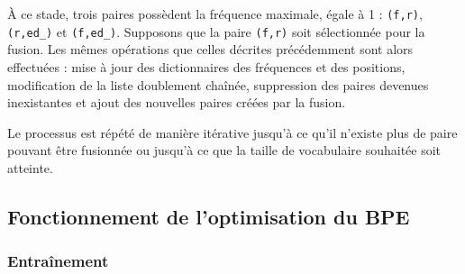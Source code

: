\documentclass[12pt,a4paper]{report}
\begin{document}
	À ce stade, trois paires possèdent la fréquence maximale, égale à 1 : \texttt{(f,r)}, \texttt{(r,ed\_)} et \texttt{(f,ed\_)}. Supposons que la paire \texttt{(f,r)} soit sélectionnée pour la fusion. Les mêmes opérations que celles décrites précédemment sont alors effectuées : mise à jour des dictionnaires des fréquences et des positions, modification de la liste doublement chaînée, suppression des paires devenues inexistantes et ajout des nouvelles paires créées par la fusion.
	
	Le processus est répété de manière itérative jusqu’à ce qu’il n’existe plus de paire pouvant être fusionnée ou jusqu’à ce que la taille de vocabulaire souhaitée soit atteinte.
	
	\subsection{Fonctionnement de l'optimisation du BPE}
	
	\subsubsection{Entraînement}
	
\end{document}

